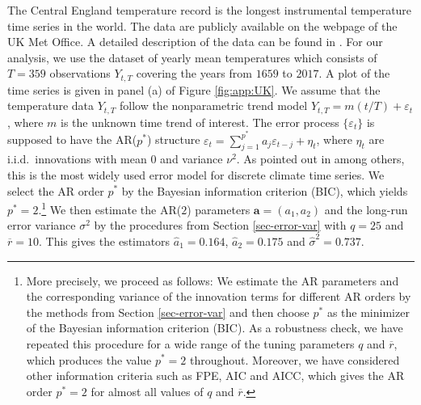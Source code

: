 The Central England temperature record is the longest instrumental temperature time series in the world. The data are publicly available on the webpage of the UK Met Office. A detailed description of the data can be found in \cite{Parker1992}. For our analysis, we use the dataset of yearly mean temperatures which consists of $T=359$ observations $Y_{t,T}$ covering the years from $1659$ to $2017$. A plot of the time series is given in panel (a) of Figure \ref{fig:app:UK}. We assume that the temperature data $Y_{t,T}$ follow the nonparametric trend model $Y_{t,T} = m(t/T) + \varepsilon_t$, where $m$ is the unknown time trend of interest. The error process $\{ \varepsilon_t \}$ is supposed to have the AR($p^*$) structure $\varepsilon_t = \sum_{j=1}^{p^*} a_j \varepsilon_{t-j} + \eta_t$, where $\eta_t$ are i.i.d.\ innovations with mean $0$ and variance $\nu^2$. As pointed out in \cite{Mudelsee2010} among others, this is the most widely used error model for discrete climate time series. We select the AR order $p^*$ by the Bayesian information criterion (BIC), which yields $p^*=2$.\footnote{More precisely, we proceed as follows: We estimate the AR parameters and the corresponding variance of the innovation terms for different AR orders by the methods from Section \ref{sec-error-var} and then choose $p^*$ as the minimizer of the Bayesian information criterion (BIC). As a robustness check, we have repeated this procedure for a wide range of the tuning parameters $q$ and $\overline{r}$, which produces the value $p^*=2$ throughout. Moreover, we have considered other information criteria such as FPE, AIC and AICC, which gives the AR order $p^*=2$ for almost all values of $q$ and $\overline{r}$.} We then estimate the AR($2$) parameters $\boldsymbol{a} = (a_1,a_2)$ and the long-run error variance $\sigma^2$ by the procedures from Section \ref{sec-error-var} with $q = 25$ and $\overline{r} = 10$. This gives the estimators $\widehat{a}_1 = 0.164$, $\widehat{a}_2 = 0.175$ and $\widehat{\sigma}^2 = 0.737$.


